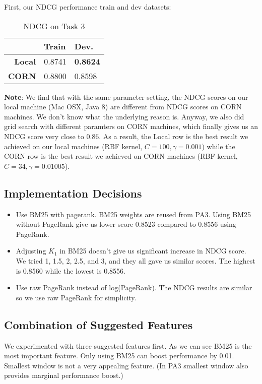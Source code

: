 \documentclass{article}
\begin{document}
First, our NDCG performance train and dev datasets:

\begin{table}[!htb]
    \centering
    \begin{tabular}{| r | l | l |}
        \hline
        & \textbf{Train} & \textbf {Dev.} \\
        \hline
        \textbf{Local} & 0.8741 & \textbf{0.8624} \\
        \hline
        \textbf{CORN} & 0.8800 & 0.8598 \\
        \hline
    \end{tabular}
    \caption{NDCG on Task 3}
\end{table}

\textbf{Note}: We find that with the same parameter setting, the NDCG scores on our local machine (Mac OSX, Java 8) are different from NDCG scores on CORN machines. We don't know what the underlying reason is. Anyway, we also did grid search with different paramters on CORN machines, which finally gives us an NDCG score very close to 0.86. As a result, the Local row is the best result we achieved on our local machines (RBF kernel, $C=100,\gamma=0.001$) while the CORN row is the best result we achieved on CORN machines (RBF kernel, $C=34,\gamma=0.01005$).

\subsection{Implementation Decisions}

\begin{itemize}
    \item Use BM25 with pagerank. BM25 weights are reused from PA3. Using BM25 without PageRank give us lower score 0.8523 compared to 0.8556 using PageRank.
    \item Adjusting $K_1$ in BM25 doesn't give us significant increase in NDCG score. We tried 1, 1.5, 2, 2.5, and 3, and they all gave us similar scores. The highest is 0.8560 while the lowest is 0.8556.
    \item Use raw PageRank instead of log(PageRank). The NDCG results are similar so we use raw PageRank for simplicity.
\end{itemize}

\subsection{Combination of Suggested Features}

We experimented with three suggested features first. As we can see BM25 is the most important feature. Only using BM25 can boost performance by 0.01. Smallest window is not a very appealing feature. (In PA3 smallest window also provides marginal performance boost.)
\end{document}
